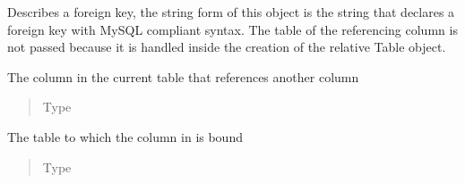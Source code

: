 \documentclass[letterpaper,10pt,english]{sphinxmanual}
\begin{document}
\begin{fulllineitems}
\label{\detokenize{model:simple_sql.model.foreign_key.ForeignKey}}
\sphinxAtStartPar
Describes a foreign key, the string form of this object is the
string that declares a foreign key with MySQL compliant syntax.
The table of the referencing column is not passed because it is
handled inside the creation of the relative Table object.

\begin{fulllineitems}
\label{\detokenize{model:simple_sql.model.foreign_key.ForeignKey.__from_column}}
\sphinxAtStartPar
The column in the current table that references another column
\begin{quote}\begin{description}
\item[{Type}] \leavevmode
\sphinxAtStartPar
{\hyperref[\detokenize{model:simple_sql.model.column.Column}]{}}

\end{description}\end{quote}

\end{fulllineitems}


\begin{fulllineitems}
\label{\detokenize{model:simple_sql.model.foreign_key.ForeignKey.__to_table}}
\sphinxAtStartPar
The table to which the column in  is bound
\begin{quote}\begin{description}
\item[{Type}] \leavevmode
\sphinxAtStartPar
{\hyperref[\detokenize{model:simple_sql.model.table.Table}]{}}


\end{description}
\end{quote}
\end{fulllineitems}
\end{fulllineitems}
\end{document}
